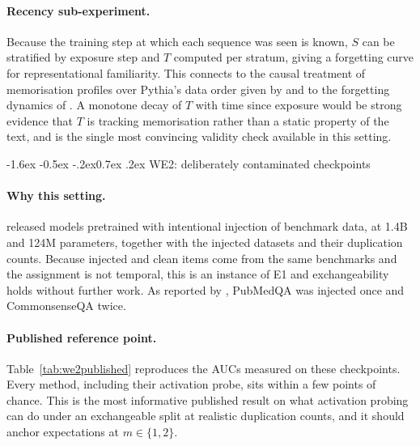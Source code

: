 \documentclass[10pt,twocolumn,letterpaper]{article}
\makeatletter
\renewcommand\subsection{\@startsection{subsection}{2}{\z@}%
  {-1.6ex \@plus -0.5ex \@minus -.2ex}{0.7ex \@plus .2ex}%
  {\normalfont\normalsize\bfseries}}
\makeatother
\begin{document}
\paragraph{Recency sub-experiment.} Because the training step at which each sequence was seen is known, $S$ can be stratified by exposure step and $T$ computed per stratum, giving a forgetting curve for representational familiarity. This connects to the causal treatment of memorisation profiles over Pythia's data order given by \citet{lesci2024causal} and to the forgetting dynamics of \citet{jagielski2023forgetting}. A monotone decay of $T$ with time since exposure would be strong evidence that $T$ is tracking memorisation rather than a static property of the text, and is the single most convincing validity check available in this setting.


\subsection{WE2: deliberately contaminated checkpoints}
\label{sec:we2}

\paragraph{Why this setting.} \citet{oren2024proving} released models pretrained with intentional injection of benchmark data, at 1.4B and 124M parameters, together with the injected datasets and their duplication counts. Because injected and clean items come from the same benchmarks and the assignment is not temporal, this is an instance of E1 and exchangeability holds without further work. As reported by \citet{liu2024probing}, PubMedQA \cite{jin2019pubmedqa} was injected once and CommonsenseQA \cite{talmor2019csqa} twice.

\paragraph{Published reference point.} Table~\ref{tab:we2published} reproduces the AUCs \citet{liu2024probing} measured on these checkpoints. Every method, including their activation probe, sits within a few points of chance. This is the most informative published result on what activation probing can do under an exchangeable split at realistic duplication counts, and it should anchor expectations at $m\in\{1,2\}$.
\end{document}

